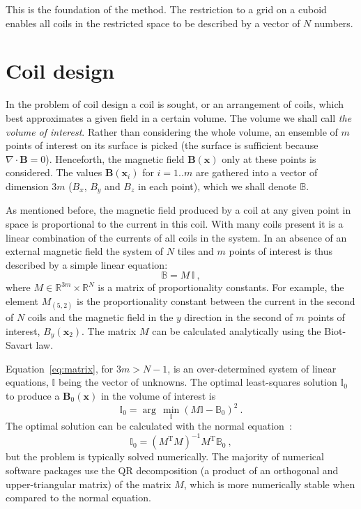 This is the foundation of the method. The restriction to a grid on a cuboid enables all coils in the restricted space to be described by a vector of $N$ numbers.




\section{Coil design}
In the problem of coil design a coil is sought, or an arrangement of coils, which best approximates a given field in a certain volume. The volume we shall call \emph{the volume of interest}. Rather than considering the whole volume, an ensemble of $m$ points of interest on its surface is picked (the surface is sufficient because $\nabla \cdot \mathbf{B} = 0$). Henceforth, the magnetic field $\mathbf{B}(\mathbf{x})$ only at these points is considered. The values $\mathbf{B}(\mathbf{x}_i)$ for $i = 1 .. m$ are gathered into a vector of dimension $3m$ ($B_x$, $B_y$ and $B_z$ in each point), which we shall denote $\mathbb{B}$.

As mentioned before, the magnetic field produced by a coil at any given point in space is proportional to the current in this coil. With many coils present it is a linear combination of the currents of all coils in the system. In an absence of an external magnetic field the system of $N$ tiles and $m$ points of interest is thus described by a simple linear equation:
\begin{equation}
  \label{eq:matrix}
  \mathbb{B} = M \, \mathbb{I}\ ,
\end{equation}
where $M \in \mathbb{R}^{3 m} \times \mathbb{R}^{N}$ is a matrix of proportionality constants. For example, the element $M_{(5, 2)}$ is the proportionality constant between the current in the second of $N$ coils and the magnetic field in the $y$ direction in the second of $m$ points of interest, $B_y(\mathbf{x}_2)$. The matrix $M$ can be calculated analytically using the Biot-Savart law.

Equation~\ref{eq:matrix}, for $3m > N - 1$, is an over-determined system of linear equations, $\mathbb{I}$ being the vector of unknowns. The optimal least-squares solution $\mathbb{I}_0$ to produce a $\mathbf{B}_0(\mathbf{x})$ in the volume of interest is
\begin{equation}
  \label{eq:requirement}
  \mathbb{I}_0 = \arg\,\min_{\mathbb{I}} {\left( M \mathbb{I} - \mathbb{B}_0 \right)}^2 \ .
\end{equation}
The optimal solution can be calculated with the normal equation~\cite{Anton}:
\begin{equation}
  \mathbb{I}_0 = {\left( M^\mathrm{T} M \right)}^{-1} M^\mathrm{T} \mathbb{B}_0 \ ,
\end{equation}
but the problem is typically solved numerically. The majority of numerical software packages use the QR decomposition (a product of an orthogonal and upper-triangular matrix) of the matrix $M$, which is more numerically stable when compared to the normal equation.

